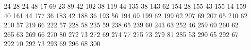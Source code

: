 24 28
24 48
17 69
23 89
42 102
38 119
44 135
38 143
62 154
28 155
43 155
14 159
40 161
44 177
36 183
42 188
36 193
56 194
69 199
62 199
62 207
69 207
65 210
62 210
57 219
66 222
57 228
58 235
59 238
65 239
60 243
63 252
46 259
60 260
62 265
63 269
66 270
80 272
73 272
69 274
77 275
73 279
81 285
53 290
65 292
67 292
70 292
73 293
69 296
68 300
